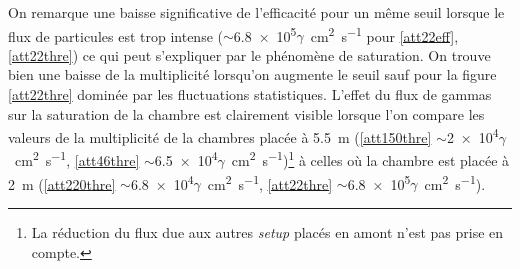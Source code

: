 
On remarque une baisse significative de l'efficacité pour un même seuil lorsque le flux de particules est trop intense ($\sim$\num{6.8e5}$\gamma$\si{\per\square\centi\meter\per\second} pour \ref{att22eff}, \ref{att22thre}) ce qui peut s'expliquer par le phénomène de saturation. On trouve bien une baisse de la multiplicité lorsqu'on augmente le seuil sauf pour la figure \ref{att22thre} dominée par les fluctuations statistiques. L'effet du flux de gammas sur la saturation de la chambre est clairement visible lorsque l'on compare les valeurs de la multiplicité de la chambres placée à \SI{5.5}{\meter} (\ref{att150thre} $\sim$\num{2e4}$\gamma$\si{\per\square\centi\meter\per\second}, \ref{att46thre} $\sim$\num{6.5e4}$\gamma$\si{\per\square\centi\meter\per\second})\footnote{La réduction du flux due aux autres \textit{setup} placés en amont n'est pas prise en compte.} à celles où la chambre est placée à \SI{2}{\meter} (\ref{att220thre} $\sim$\num{6.8e4}$\gamma$\si{\per\square\centi\meter\per\second}, \ref{att22thre} $\sim$\num{6.8e5}$\gamma$\si{\per\square\centi\meter\per\second}).


